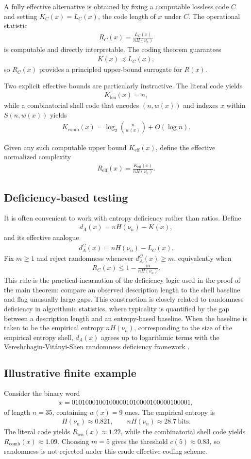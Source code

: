 \documentclass[12pt]{article}
\newcommand{\be}{\begin{eqnarray}}
\newcommand{\ee}{\end{eqnarray}}
\begin{document}
A fully effective alternative is obtained by fixing a computable lossless code
$C$ and setting $K_C(x)=L_C(x)$, the code length of $x$ under $C$. The operational
statistic
\be
R_C(x)=\frac{L_C(x)}{nH(\nu_n)}
\label{eq:RC_def_clean}
\ee
is computable and directly interpretable. The coding theorem guarantees
\be
K(x)\preceq L_C(x),
\ee
so $R_C(x)$ provides a principled upper-bound surrogate for $R(x)$.

Two explicit effective bounds are particularly instructive. The literal code
yields
\be
K_{\mathrm{len}}(x)=n,
\ee
while a combinatorial shell code that encodes $(n,w(x))$ and indexes $x$ within
$S(n,w(x))$ yields
\be
K_{\mathrm{comb}}(x)=\log_2\binom{n}{w(x)}+O(\log n).
\ee

Given any such computable upper bound $K_{\mathrm{eff}}(x)$, define the effective
normalized complexity
\be
R_{\mathrm{eff}}(x)=\frac{K_{\mathrm{eff}}(x)}{nH(\nu_n)}.
\label{eq:Reff_def_clean}
\ee

\subsection*{Deficiency-based testing}

It is often convenient to work with entropy deficiency rather than ratios.
Define
\be
d_A(x)=nH(\nu_n)-K(x),
\ee
and its effective analogue
\be
d_A^C(x)=nH(\nu_n)-L_C(x).
\ee
Fix $m\ge1$ and reject randomness whenever $d_A^C(x)\ge m$, equivalently when
\be
R_C(x)\le1-\frac{m}{nH(\nu_n)}.
\label{eq:test_threshold_clean}
\ee
This rule is the practical incarnation of the deficiency logic used in the
proof of the main theorem: compare an observed description length to the shell
baseline and flag unusually large gaps. This construction is closely related to randomness deficiency in algorithmic statistics, where typicality is quantified by the gap between a description length and an entropy-based baseline. When the baseline is taken to be the empirical entropy $nH(\nu_n)$, corresponding to the size of the empirical entropy shell, $d_A(x)$ agrees up to logarithmic terms with the Vereshchagin-Vitányi-Shen randomness deficiency framework \citep{VereshchaginVitanyi2004, VereshchaginShen2015}.

\subsection*{Illustrative finite example}

Consider the binary word
\be
x=01010001001000001010000100000100001,
\ee
of length $n=35$, containing $w(x)=9$ ones. The empirical entropy is
\be
H(\nu_n)\approx0.821,
\qquad
nH(\nu_n)\approx28.7\ \text{bits}.
\ee
The literal code yields $R_{\mathrm{len}}(x)\approx1.22$, while the
combinatorial shell code yields $R_{\mathrm{comb}}(x)\approx1.09$. Choosing
$m=5$ gives the threshold $c(5)\approx0.83$, so randomness is not rejected under
this crude effective coding scheme.
\end{document}
